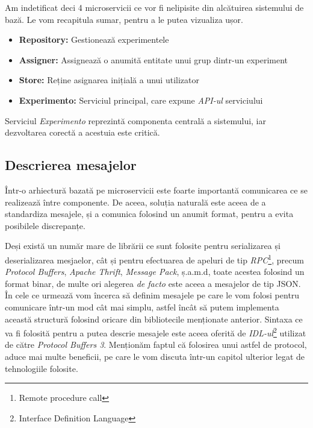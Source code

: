 Am indetificat deci 4 microservicii ce vor fi nelipisite din alcătuirea sistemului de bază. Le vom recapitula sumar, pentru a le putea vizualiza ușor.

\begin{itemize}
	\item \textbf{Repository:} Gestionează experimentele
	\item \textbf{Assigner:} Assignează o anumită entitate unui grup dintr-un experiment
	\item \textbf{Store:} Reține asignarea inițială a unui utilizator
	\item \textbf{Experimento:} Serviciul principal, care expune \textit{API-ul} serviciului 
\end{itemize}

\begin{remark}
	Serviciul \textit{Experimento} reprezintă componenta centrală a sistemului, iar dezvoltarea corectă a acestuia este critică.
\end{remark}

\subsection{Descrierea mesajelor}

Într-o arhiectură bazată pe microservicii este foarte importantă comunicarea ce se realizează între componente. De aceea, soluția naturală este aceea de a standardiza mesajele, și a comunica folosind un anumit format, pentru a evita posibilele discrepanțe.

Deși există un număr mare de librării ce sunt folosite pentru serializarea și deserializarea mesjaelor, cât și pentru efectuarea de apeluri de tip \textit{RPC}\footnote{Remote procedure call}, precum \textit{Protocol Buffers}, \textit{Apache Thrift}, \textit{Message Pack}, ș.a.m.d, toate acestea folosind un format binar, de multe ori alegerea \textit{de facto} este aceea a mesajelor de tip JSON. În cele ce urmează vom încerca să definim mesajele pe care le vom folosi pentru comunicare într-un mod cât mai simplu, astfel încât să putem implementa această structură folosind oricare din bibliotecile menționate anterior. Sintaxa ce va fi folosită pentru a putea descrie mesajele este aceea oferită de \textit{IDL-ul}\footnote{Interface Definition Language} utilizat de către \textit{Protocol Buffers 3}. Menționăm faptul că folosirea unui astfel de protocol, aduce mai multe beneficii, pe care le vom discuta într-un capitol ulterior legat de tehnologiile folosite.

